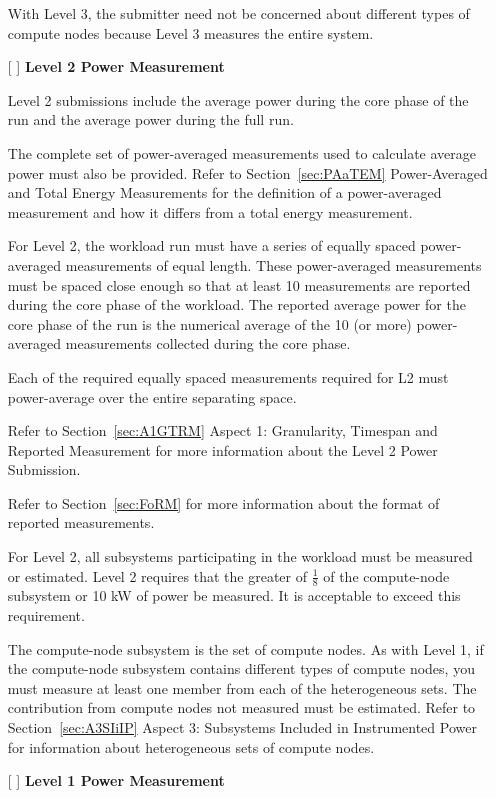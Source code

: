 \begin{itemize}
With Level 3, the submitter need not be concerned about different types of compute nodes because Level 3 measures the entire system.

\newpage
\item[{[ ]}]
\textbf{Level 2 Power Measurement}

Level 2 submissions include the average power during the core phase of the run and the average power during the full run.

The complete set of power-averaged measurements used to calculate average power must also be provided. 
Refer to Section~\ref{sec:PAaTEM} Power-Averaged and Total Energy Measurements for the definition of a power-averaged measurement and how it differs from a total energy measurement.

For Level 2, the workload run must have a series of equally spaced power-averaged measurements of equal length. These power-averaged measurements must be spaced close enough so that at least 10 measurements are reported during the core phase of the workload. The reported average power for the core phase of the run is the numerical average of the 10 (or more) power-averaged measurements collected during the core phase.

Each of the required equally spaced measurements required for L2 must power-average over the entire separating space. 

Refer to Section~\ref{sec:A1GTRM} Aspect 1: Granularity, Timespan and Reported Measurement for more information about the Level 2 Power Submission. 

Refer to Section~\ref{sec:FoRM} for more information about the format of reported measurements.

For Level 2, all subsystems participating in the workload must be measured or estimated. Level 2 requires that the 
greater of $ \frac{1}{8} $ of the compute-node subsystem or 10 kW of power be measured. It is acceptable to exceed this requirement.

The compute-node subsystem is the set of compute nodes. As with Level 1, if the compute-node subsystem contains different types of compute nodes, you must measure at least one member from each of the heterogeneous sets. The contribution from compute nodes not measured must be estimated. Refer to Section~\ref{sec:A3SIiIP} Aspect 3: Subsystems Included in Instrumented Power for information about heterogeneous sets of compute nodes.


\newpage
\item[{[ ]}]
\textbf{Level 1 Power Measurement}


\end{itemize}
